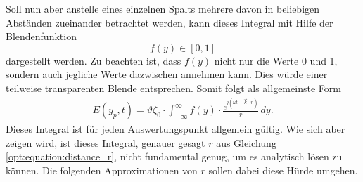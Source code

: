 Soll nun aber anstelle eines einzelnen Spalts mehrere davon in beliebigen Abständen zueinander betrachtet werden, kann dieses Integral mit Hilfe der Blendenfunktion
\begin{equation*}
f(y)
\in
[0, 1]
\end{equation*}
dargestellt werden.
Zu beachten ist, dass $f(y)$ nicht nur die Werte 0 und 1, sondern auch jegliche Werte dazwischen annehmen kann.
Dies würde einer teilweise transparenten Blende entsprechen.
Somit folgt als allgemeinste Form
\begin{align}
E(y_p, t)
=
\vartheta\zeta_0 \cdot \int_{-\infty}^{\infty}f(y)\cdot\frac{e^{j(\omega t - \vec{k}\cdot\vec{r})}}{r} \,dy
.
\label{opt:equation:integral_general}
\end{align}
Dieses Integral ist für jeden Auswertungspunkt allgemein gültig.
Wie sich aber zeigen wird, ist dieses Integral, genauer gesagt $r$ aus Gleichung \eqref{opt:equation:distance_r}, nicht fundamental genug, um es analytisch lösen zu können.
Die folgenden Approximationen von $r$ sollen dabei diese Hürde umgehen.


